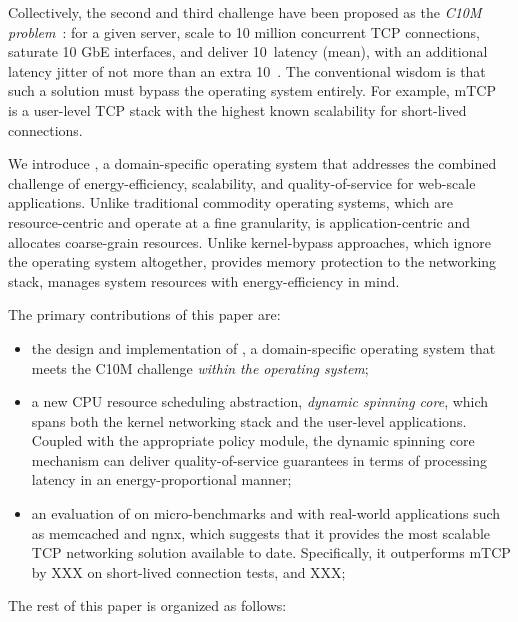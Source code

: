 Collectively, the second and third challenge have been proposed as the
\emph{C10M problem}~\cite{theC10Mproblem}: for a given server, scale
to 10 million concurrent TCP connections, saturate 10 GbE interfaces,
and deliver 10~\microsecond latency (mean), with an additional latency
jitter of not more than an extra 10~\microsecond.  The conventional
wisdom is that such a solution must bypass the operating system
entirely.  For example, mTCP~\cite{jeong2014mtcp} is a user-level TCP
stack with the highest known scalability for short-lived connections.


We introduce \ix, a domain-specific operating system that
addresses the combined challenge of energy-efficiency, scalability,
and quality-of-service for web-scale applications.  Unlike traditional
commodity operating systems, which are resource-centric and operate at
a fine granularity, \ix is application-centric and allocates
coarse-grain resources.  Unlike kernel-bypass approaches, which ignore
the operating system altogether, \ix provides memory protection to the
networking stack, manages system resources with energy-efficiency
in mind.

The primary contributions of this paper are:

\begin{itemize}

\item the design and implementation of \ix, a domain-specific
  operating system that meets the C10M challenge \emph{within the
    operating system};

\item a new CPU resource scheduling abstraction, \emph{dynamic
  spinning core}, which spans both the kernel networking stack and the
  user-level applications.  Coupled with the appropriate policy
  module, the dynamic spinning core mechanism can deliver quality-of-service
  guarantees in terms of processing latency in an energy-proportional
  manner;

\item an evaluation of \ix on micro-benchmarks and with real-world
  applications such as memcached and ngnx, which suggests that it
  provides the most scalable TCP networking solution available to
  date.  Specifically, it outperforms mTCP by XXX on short-lived
  connection tests, and XXX;

\end{itemize}


The rest of this paper is organized as follows: 


